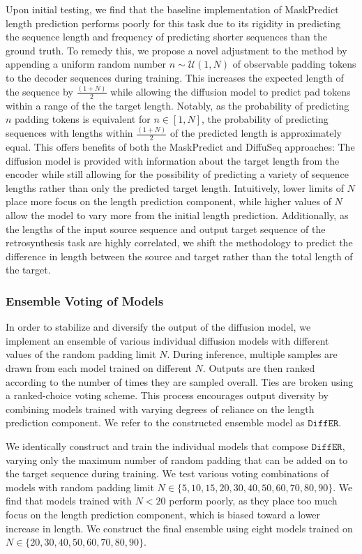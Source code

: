 \documentclass{article}
\newcommand{\ours}{$\texttt{DiffER}$\xspace}
\begin{document}
Upon initial testing, we find that the baseline implementation of MaskPredict length prediction performs poorly for this task due to its rigidity in predicting the sequence length and frequency of predicting shorter sequences than the ground truth. To remedy this, we propose a novel adjustment to the method by appending a uniform random number $n \sim \mathcal{U}(1, N)$ of observable padding tokens to the decoder sequences during training. This increases the expected length of the sequence by $\frac{(1 + N)}{2}$ while allowing the diffusion model to predict pad tokens within a range of the the target length. Notably, as the probability of predicting $n$ padding tokens is equivalent for $n \in [1, N]$, the probability of predicting sequences with lengths within $\frac{(1 + N)}{2}$ of the predicted length is approximately equal. This offers benefits of both the MaskPredict and DiffuSeq approaches: The diffusion model is provided with information about the target length from the encoder while still allowing for the possibility of predicting a variety of sequence lengths rather than only the predicted target length. Intuitively, lower limits of $N$ place more focus on the length prediction component, while higher values of $N$ allow the model to vary more from the initial length prediction. Additionally, as the lengths of the input source sequence and output target sequence of the retrosynthesis task are highly correlated, we shift the methodology to predict the difference in length between the source and target rather than the total length of the target.

\subsubsection{Ensemble Voting of Models}

In order to stabilize and diversify the output of the diffusion model, we implement an ensemble of various individual diffusion models with different values of the random padding limit $N$. During inference, multiple samples are drawn from each model trained on different $N$. Outputs are then ranked according to the number of times they are sampled overall. Ties are broken using a ranked-choice voting scheme. This process encourages output diversity by combining models trained with varying degrees of reliance on the length prediction component. We refer to the constructed ensemble model as \ours.

We identically construct and train the individual models that compose \ours,  varying only the maximum number of random padding that can be added on to the target sequence during training. We test various voting combinations of models with random padding limit $N \in \{5, 10, 15, 20, 30, 40, 50, 60, 70, 80, 90\}$. We find that models trained with $N < 20$ perform poorly, as they place too much focus on the length prediction component, which is biased toward a lower increase in length. We construct the final ensemble using eight models trained on $N \in \{20, 30, 40, 50, 60, 70, 80, 90\}$.
\end{document}
